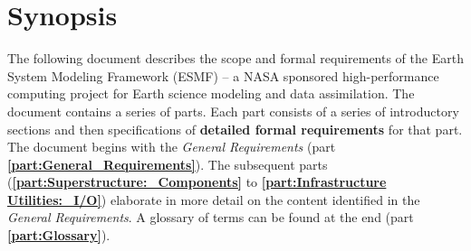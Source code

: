 \section{Synopsis}

The following document describes the scope and formal requirements
of the Earth System Modeling Framework (ESMF) -- a NASA sponsored 
high-performance computing project for Earth science modeling and 
data assimilation. The document contains a series of parts.
Each part consists of a series of introductory
sections and then specifications of {\bf detailed formal requirements}
for that part. The document begins with the {\it General Requirements}
(part {\bf \ref{part:General_Requirements}}). The subsequent parts 
({\bf \ref{part:Superstructure:_Components}} to {\bf \ref{part:Infrastructure Utilities:_I/O}}) elaborate in more detail on the content identified in
the {\it General Requirements}.
A glossary of terms can be found at the end (part {\bf \ref{part:Glossary}}).







